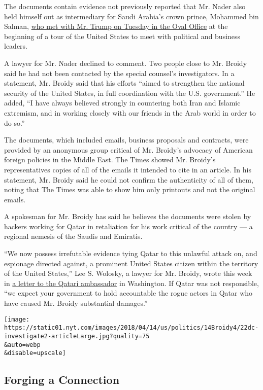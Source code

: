 The documents contain evidence not previously reported that Mr. Nader
also held himself out as intermediary for Saudi Arabia's crown prince,
Mohammed bin Salman,
\href{https://www.nytimes.com/2018/03/20/us/politics/saudi-crown-prince-arrives-at-white-house-to-meet-with-trump.html}{who
met with Mr. Trump on Tuesday in the Oval Office} at the beginning of a
tour of the United States to meet with political and business leaders.

A lawyer for Mr. Nader declined to comment. Two people close to Mr.
Broidy said he had not been contacted by the special counsel's
investigators. In a statement, Mr. Broidy said that his efforts ``aimed
to strengthen the national security of the United States, in full
coordination with the U.S. government.'' He added, ``I have always
believed strongly in countering both Iran and Islamic extremism, and in
working closely with our friends in the Arab world in order to do so.''

The documents, which included emails, business proposals and contracts,
were provided by an anonymous group critical of Mr. Broidy's advocacy of
American foreign policies in the Middle East. The Times showed Mr.
Broidy's representatives copies of all of the emails it intended to cite
in an article. In his statement, Mr. Broidy said he could not confirm
the authenticity of all of them, noting that The Times was able to show
him only printouts and not the original emails.

A spokesman for Mr. Broidy has said he believes the documents were
stolen by hackers working for Qatar in retaliation for his work critical
of the country --- a regional nemesis of the Saudis and Emiratis.

``We now possess irrefutable evidence tying Qatar to this unlawful
attack on, and espionage directed against, a prominent United States
citizen within the territory of the United States,'' Lee S. Wolosky, a
lawyer for Mr. Broidy, wrote this week in
\href{https://assets.documentcloud.org/documents/4417582/Elliott-Broidy-Letter-to-Qatari-Ambassador.pdf}{a
letter to the Qatari ambassador} in Washington. If Qatar was not
responsible, ``we expect your government to hold accountable the rogue
actors in Qatar who have caused Mr. Broidy substantial damages.''

\texttt{[image: https://static01.nyt.com/images/2018/04/14/us/politics/14Broidy4/22dc-investigate2-articleLarge.jpg?quality=75\\\&auto=webp\\\&disable=upscale]}

\hypertarget{forging-a-connection}{%
\subsection{Forging a Connection}\label{forging-a-connection}}

